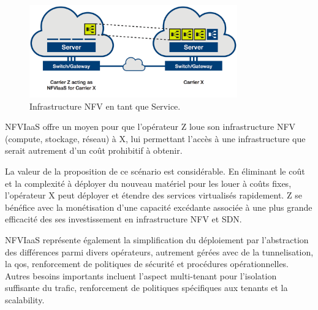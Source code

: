 \begin{figure}[h]
\begin{center}
\includegraphics[width=0.8\textwidth]{images/NFVIaaS} 
\caption{Infrastructure NFV en tant que Service. \cite{OFSDNNFVand}} \label{nfviaas}
\end{center}
\end{figure} 

NFVIaaS offre un moyen pour que l'opérateur Z loue son infrastructure NFV (compute, stockage, réseau) à X, lui permettant l'accès à une infrastructure que serait autrement d'un coût prohibitif à obtenir.

La valeur de la proposition de ce scénario est considérable. En éliminant le coût et la complexité à déployer du nouveau matériel pour les louer à coûts fixes, l'opérateur X peut déployer et étendre des services virtualisés rapidement. Z se bénéfice avec la monétisation d'une capacité excédante associée à une plus grande efficacité des ses investissement en infrastructure NFV et SDN.

NFVIaaS représente également la simplification du déploiement par l'abstraction des différences parmi divers opérateurs, autrement gérées avec de la tunnelisation, la \gls{qos}, renforcement de politiques de sécurité et procédures opérationnelles. Autres besoins importants incluent l'aspect multi-tenant pour l'isolation suffisante du trafic, renforcement de politiques spécifiques aux tenants et la \gls{scalability}.

